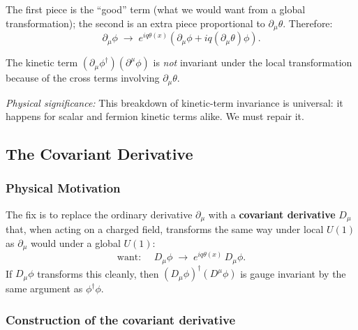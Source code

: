 \documentclass[../main.tex]{subfiles}
\begin{document}
The first piece is the ``good'' term (what we would want from a global transformation); the second is an extra piece proportional to $\partial_\mu\theta$.  Therefore:
\begin{equation}
  \boxed{
  \partial_\mu\phi\;\longrightarrow\;
  e^{iq\theta(x)}\!\left(\partial_\mu\phi + iq(\partial_\mu\theta)\phi\right).}
  \label{eq:lec10:derivative-bad}
\end{equation}

The kinetic term $(\partial_\mu\phi^\dagger)(\partial^\mu\phi)$ is \emph{not} invariant under the local transformation because of the cross terms involving $\partial_\mu\theta$.

\textit{Physical significance:} This breakdown of kinetic-term invariance is universal: it happens for scalar and fermion kinetic terms alike.  We must repair it.

\subsection*{The Covariant Derivative}

\subsubsection*{Physical Motivation}

The fix is to replace the ordinary derivative $\partial_\mu$ with a \textbf{covariant derivative} $D_\mu$ that, when acting on a charged field, transforms the same way under local $U(1)$ as $\partial_\mu$ would under a global $U(1)$:
\begin{equation}
  \text{want: }\quad
  D_\mu\phi \;\longrightarrow\; e^{iq\theta(x)}\,D_\mu\phi.
  \label{eq:lec10:cov-deriv-requirement}
\end{equation}
If $D_\mu\phi$ transforms this cleanly, then $(D_\mu\phi)^\dagger(D^\mu\phi)$ is gauge invariant by the same argument as $\phi^\dagger\phi$.

\subsubsection*{Construction of the covariant derivative}

\end{document}

